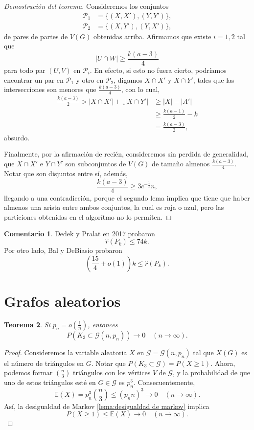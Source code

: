 \documentclass[12pt]{report}
\theoremstyle{plain}
\newtheorem{theorem}{Teorema}[section]
\theoremstyle{definition}
\newtheorem{remark}[theorem]{Comentario}
\newcommand{\abs}[1]{\left \vert #1 \right \vert}
\renewcommand{\hat}[1]{\widehat{#1}}
\begin{document}
\begin{proof}[Demostración del teorema]
Consideremos los conjuntos
\begin{align*}
\mathcal P_1 &= \{(X,X'), (Y,Y')\}, \\
\mathcal P_2 &= \{(X,Y'), (Y, X')\},
\end{align*}
de pares de partes de $V(G)$ obtenidas arriba. Afirmamos que existe $i = 1,2$ tal que
\[
    \abs{U \cap W} \geq \frac{k (a-3)}{4}
\]
para todo par $(U,V)$ en $\mathcal P_i$. En efecto, si esto no fuera cierto, podríamos encontrar un par en $\mathcal P_1$ y otro en $\mathcal P_2$, digamos $X \cap X'$ y $X \cap Y'$, tales que las intersecciones son menores que $\frac{k(a-3)}4$, con lo cual,
\begin{align*}
\frac{k(a-3)}{2} > \abs{X \cap X'} + ¸\abs{X \cap Y'} &\geq \abs X - \abs{A'} \\
&\geq \frac{k(a-1)}{2} - k \\
&= \frac{k(a-3)}{2},
\end{align*}
absurdo.

Finalmente, por la afirmación de recién, consideremos sin perdida de generalidad, que $X \cap X'$ e $Y \cap Y'$ son subconjuntos de $V(G)$ de tamaño almenos $\frac{k(a-3)}{4}$. Notar que son disjuntos entre sí, además,
\[
    \frac{k(a-3)}{4} \geq 3 c^{-\frac 1 2} n,
\]
llegando a una contradicción, porque el segundo lema implica que tiene que haber almenos una arista entre ambos conjuntos, la cual es roja o azul, pero las particiones obtenidas en el algorítmo no lo permiten.
\end{proof}



\begin{remark}
Dedek y Pralat en 2017 probaron
\[
    \hat r (P_k) \leq 74 k.
\]
Por otro lado, Bal y DeBiasio probaron
\[
    \left ( \frac {15} 4 + o(1) \right ) k \leq \hat r (P_k).
\]
\end{remark}


\section{Grafos aleatorios}

\begin{theorem}
Si $p_n = o(\frac 1 n)$, entonces
\[
    P(K_3 \subset \mathcal G (n,p_n)) \longrightarrow 0 \quad (n \to \infty).
\]
\end{theorem}
\begin{proof}
Consideremos la variable aleatoria $X$ en $\mathcal G = \mathcal G(n,p_n)$ tal que $X(G)$ es el número de triángulos en $G$. Notar que $P(K_3 \subset \mathcal G) = P(X \geq 1)$. Ahora, podemos formar $\binom n 3$ triángulos con los vértices $V$ de $\mathcal G$, y la probabilidad de que uno de estos triángulos esté en $G \in \mathcal G$ es $p^3_n$. Consecuentemente,
\[
    \mathbb{E} (X) = p^3_n \binom n 3 \leq (p_nn)^3 \longrightarrow 0 \quad (n \to \infty).
\]
Así, la desigualdad de Markov \ref{lema:desigualdad de markov} implica
\[
    P(X \geq 1) \leq \mathbb{E} (X) \longrightarrow 0 \quad (n \to \infty).
\]
\end{proof}
\end{document}

